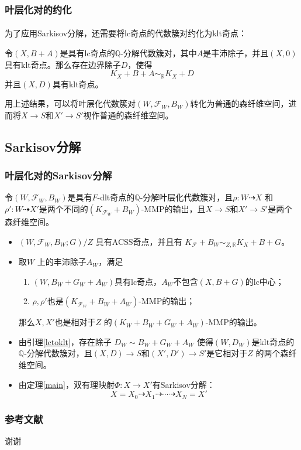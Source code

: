 \documentclass[10pt]{ctexbeamer}
\begin{document}
\begin{frame}[shrink]
  \frametitle{叶层化对的约化}
  \framesubtitle{}
为了应用Sarkisov分解，还需要将lc奇点的代数簇对约化为klt奇点：
  \pause
\begin{lemma}\label{lctoklt}
 令$(X,B+A)$是具有lc奇点的$\mathbb{Q}$-分解代数簇对，其中$A$是丰沛除子，并且$(X,0)$具有klt奇点。那么存在边界除子$D$，使得
 \[ K_{X}+B+A\sim_{\mathbb{R}}K_{X}+D \]
 并且$(X,D)$具有klt奇点。
\end{lemma}
  \pause
用上述结果，可以将叶层化代数簇对$(W,\mathcal{F}_{W},B_{W})$转化为普通的森纤维空间，进而将$X\to S$和$X' \to S'$视作普通的森纤维空间。
  
\end{frame}

\subsection{Sarkisov分解}
\begin{frame}[shrink]
  \frametitle{叶层化对的Sarkisov分解}
  令$(W,\mathcal{F}_{W},B_{W})$是具有$F$-dlt奇点的$\mathbb{Q}$-分解叶层化代数簇对，且$\rho:W\dashrightarrow X$ 和$\rho':W \dashrightarrow X'$是两个不同的$(K_{\mathcal{F}_{W}}+B_{W})$-MMP的输出，且$X \to S$和$X' \to S'$是两个森纤维空间。

\begin{itemize}
  \pause
  \item
  $(W,\mathcal{F}_{W},B_{W};G)/Z$ 具有ACSS奇点，并且有 $K_{\mathcal{F}}+B_{W} \sim_{Z,\mathbb{R}} K_{X}+B+G$。
  \pause
  \item 
  取$W$ 上的丰沛除子$A_{W}$，满足
 \begin{enumerate}
   \item $(W,B_{W}+G_{W}+A_{W}) $具有lc奇点，$A_{W}$不包含$(X,B+G)$的lc中心；
   \item $\rho,\rho' $也是$(K_{\mathcal{F}_{W}}+B_{W}+A_{W})$-MMP的输出；
 \end{enumerate}
 那么$X,X'$也是相对于$Z$ 的$(K_{W}+B_{W}+G_{W}+A_{W})$-MMP的输出。
  \pause
  \item 
 由引理\ref{lctoklt}，存在除子  $D_{W}\sim B_{W}+G_{W}+A_{W}$  使得$(W,D_{W})$是klt奇点的$\mathbb{Q}$-分解代数簇对，且$(X,D)\to S $和$(X',D')\to S' $是它相对于$Z$ 的两个森纤维空间。
  \pause
  \item 
由定理\ref{main}，双有理映射$\Phi:X\to X'$有Sarkisov分解：
\[ X=X_{0}\dashrightarrow X_{1}\dashrightarrow \cdots \dashrightarrow X_{N}=X' \] 
\end{itemize}
\end{frame}

\makeatother



\begin{frame}
  \frametitle{参考文献}
  \printbibliography%
\end{frame}

\begin{frame}[plain]
  \vfill
  \centerline{\Huge 谢谢}
  \vfill
\end{frame}
\end{document}
